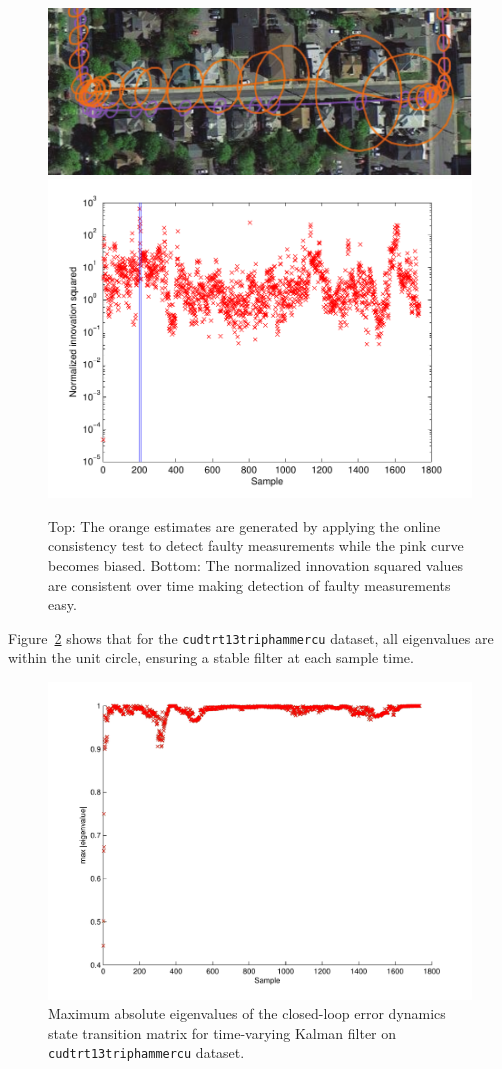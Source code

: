 \begin{figure}
\includegraphics[width=\columnwidth]{cu_corruption}\\
\includegraphics[width=\columnwidth]{nis_cu_corruption}
\caption{Top: The orange estimates are generated by applying the online consistency test to detect faulty measurements while the pink curve becomes biased.  Bottom: The normalized innovation squared values are consistent over time making detection of faulty measurements easy.}
\label{fig:cu_corruption}
\end{figure}

Figure~\ref{fig:max_eigenvalue} shows that for the \texttt{cudtrt13triphammercu} dataset, all eigenvalues are within the unit circle, ensuring a stable filter at each sample time.

\begin{figure}[!t]
\includegraphics[width=\columnwidth]{eigenvalues}
\caption{Maximum absolute eigenvalues of the closed-loop error dynamics state transition matrix for time-varying Kalman filter on \texttt{cudtrt13triphammercu} dataset.}
\label{fig:max_eigenvalue}
\end{figure}

